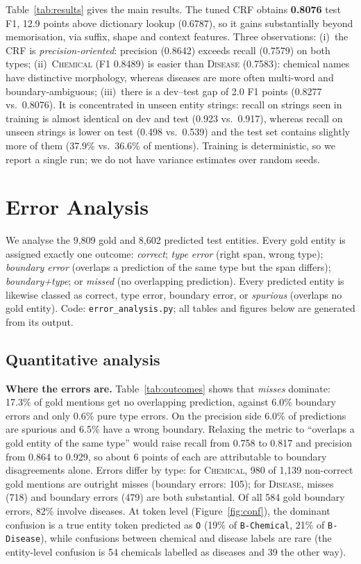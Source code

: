 \documentclass[10pt,a4paper]{article}
\newcommand{\chem}{\textsc{Chemical}}
\newcommand{\dis}{\textsc{Disease}}
\begin{document}
Table~\ref{tab:results} gives the main results. The tuned CRF obtains \textbf{0.8076} test F1, 12.9 points above dictionary lookup (0.6787), so it gains substantially beyond memorisation,
via suffix, shape and context features. Three observations: (i)~the CRF is \emph{precision-oriented}: precision (0.8642) exceeds recall (0.7579) on both types;
(ii)~\chem{} (F1 0.8489) is easier than \dis{} (0.7583): chemical names have distinctive morphology, whereas diseases are more often multi-word and boundary-ambiguous;
(iii)~there is a dev--test gap of 2.0 F1 points (0.8277 vs.\ 0.8076). It is concentrated in unseen entity strings: recall on strings seen in training is almost identical on dev and test (0.923 vs.\ 0.917),
whereas recall on unseen strings is lower on test (0.498 vs.\ 0.539) and the test set contains slightly more of them (37.9\% vs.\ 36.6\% of mentions).
Training is deterministic, so we report a single run; we do not have variance estimates over random seeds.

\section{Error Analysis}\label{sec:errors}
We analyse the 9{,}809 gold and 8{,}602 predicted test entities. Every gold entity is assigned exactly one outcome: \emph{correct}; \emph{type error} (right span, wrong type);
\emph{boundary error} (overlaps a prediction of the same type but the span differs); \emph{boundary+type}; or \emph{missed} (no overlapping prediction).
Every predicted entity is likewise classed as correct, type error, boundary error, or \emph{spurious} (overlaps no gold entity).
Code: \texttt{error\_analysis.py}; all tables and figures below are generated from its output.

\subsection{Quantitative analysis}


\textbf{Where the errors are.} Table~\ref{tab:outcomes} shows that \emph{misses} dominate: 17.3\% of gold mentions get no overlapping prediction,
against 6.0\% boundary errors and only 0.6\% pure type errors. On the precision side 6.0\% of predictions are spurious and 6.5\% have a wrong boundary.
Relaxing the metric to ``overlaps a gold entity of the same type'' would raise recall from 0.758 to 0.817 and precision from 0.864 to 0.929, so about 6 points of each are
attributable to boundary disagreements alone.
Errors differ by type: for \chem{}, 980 of 1{,}139 non-correct gold mentions are outright misses (boundary errors: 105); for \dis{}, misses (718) and boundary errors (479) are both substantial.
Of all 584 gold boundary errors, 82\% involve diseases. At token level (Figure~\ref{fig:conf}), the dominant confusion is a true entity token predicted as \texttt{O}
(19\% of \texttt{B-Chemical}, 21\% of \texttt{B-Disease}), while confusions between chemical and disease labels are rare (the entity-level confusion is 54 chemicals labelled as diseases and 39 the other way).
\end{document}
